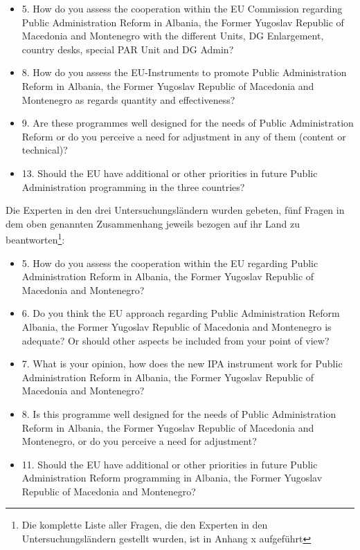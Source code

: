 \begin{itemize}
\item 5. How do you assess the cooperation within the EU Commission regarding Public Administration Reform in Albania, the Former Yugoslav Republic of Macedonia and Montenegro with the different Units, DG Enlargement, country desks, special PAR Unit and DG Admin?
\item 8. How do you assess the EU-Instruments to promote Public Administration Reform in Albania, the Former Yugoslav Republic of Macedonia and Montenegro as regards quantity and effectiveness?
\item 9. Are these programmes well designed for the needs of Public Administration Reform or do you perceive a need for adjustment in any of them (content or technical)?
\item 13. Should the EU have additional or other priorities in future Public Administration programming in the three countries?
\end{itemize}
Die Experten in den drei Untersuchungsländern wurden gebeten, fünf Fragen in dem oben genannten Zusammenhang jeweils bezogen auf ihr Land zu beantworten\footnote{Die komplette Liste aller Fragen, die den Experten in den Untersuchungsländern gestellt wurden, ist in Anhang x aufgeführt}:
\begin{itemize}
\item 5. How do you assess the cooperation within the EU regarding Public Administration Reform in Albania, the Former Yugoslav Republic of Macedonia and Montenegro?
\item 6. Do you think the EU approach regarding Public Administration Reform Albania, the Former Yugoslav Republic of Macedonia and Montenegro is adequate? Or should other aspects be included from your point of view?
\item 7. What is your opinion, how does the new IPA instrument work for Public Administration Reform in Albania, the Former Yugoslav Republic of Macedonia and Montenegro? 
\item 8. Is this programme well designed for the needs of Public Administration Reform in Albania, the Former Yugoslav Republic of Macedonia and Montenegro, or do you perceive a need for adjustment?
\item 11. Should the EU have additional or other priorities in future Public Administration Reform programming in Albania, the Former Yugoslav Republic of Macedonia and Montenegro?
\end{itemize}

